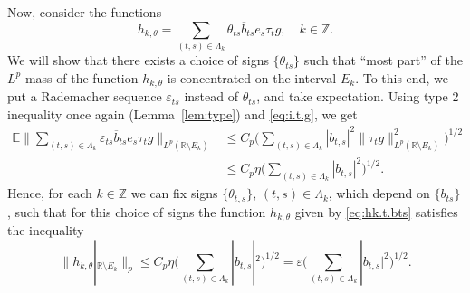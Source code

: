 \documentclass[reqno,a4paper,12pt]{amsart}
\numberwithin{equation}{section}
\numberwithin{figure}{section}
\newcommand\R{\mathbb{R}}
\newcommand\Z{\mathbb{Z}}
\newcommand\1{\mathds{1}}
\newcommand\eps{\varepsilon}
\newcommand{\ts}{\tau}
\renewcommand\le{\leqslant}
\theoremstyle{plain}
\newcommand{\lemref}[1]{Lemma~\ref{#1}}
\theoremstyle{definition}
\begin{document}
Now, consider the functions
\begin{equation}
\label{eq:hk.t.bts}
h_{k,\theta} =  \sum_{(t,s)\in\Lambda_k}  \theta_{ts}\overline{b}_{ts} e_s \ts_t g, 
\quad  k \in \Z.
\end{equation}
We will show   that there exists a choice of signs $\{\theta_{ts}\}$ such that ``most part'' of the $L^{p}$ mass of the function $h_{k,\theta}$ is concentrated on the interval $E_k$. To this end, 
we put a Rademacher sequence $\eps_{ts}$ instead of $\theta_{ts}$, and take expectation. Using type 2 inequality once again (\lemref{lem:type}) and \eqref{eq:i.t.g}, we get 
\begin{align}
\mathbb{E} \Big\| \sum_{(t,s)\in\Lambda_k}  
\eps_{ts}\overline{b}_{ts} e_s \ts_t g \Big\|_{L^p(\R\setminus E_k)}
& \le C_p  \Big( \sum_{(t,s)\in\Lambda_k}
|b_{t,s}|^2 \|\tau_t g\|_{L^p(\R\setminus E_k)}^2 \Big)^{1/2}\\
& \le C_p \eta \Big( \sum_{(t,s)\in\Lambda_k}|b_{t,s}|^2 \Big)^{1/2}.
\end{align}
Hence, for each $k \in \Z$ we can fix signs 
$\{ \theta_{t,s} \}$, $(t,s)\in\Lambda_k$,
which depend on $\{b_{ts}\}$,
such that for this choice
of signs the function $h_{k,\theta}$
given by \eqref{eq:hk.t.bts} satisfies the inequality
\begin{equation}\label{eq:conc}
\|h_{k,\theta}|_{\R\setminus E_k}\|_p 
\le C_p \eta \Big( \sum_{(t,s)\in\Lambda_k}|b_{t,s}|^2 \Big)^{1/2} 
= \eps \Big( \sum_{(t,s)\in\Lambda_k}|b_{t,s}|^2 \Big)^{1/2}.
\end{equation}
\end{document}
